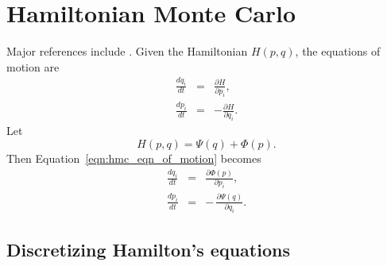 % 
% 
% 
% 
% 
%

\section{Hamiltonian Monte Carlo}
Major references include \cite{Duane1987,Neal1993,Neal1996,Neal2012}.
Given the Hamiltonian $H(p,q)$, the equations of motion are
\begin{eqnarray}
\label{eqn:hmc_eqn_of_motion}
\frac{dq_i}{dt} &=& \frac{\partial H}{\partial p_i}, \\
\frac{dp_i}{dt} &=& -\frac{\partial H}{\partial q_i}.
\end{eqnarray}
Let
\begin{equation}
H(p,q) = \Psi(q) + \Phi(p).
\end{equation}
Then Equation~\ref{eqn:hmc_eqn_of_motion} becomes
\begin{eqnarray}
\label{eqn:hmc_deriv_psi_phi}
\frac{dq_i}{dt} &=&  \frac{\partial \Phi(p)}{\partial p_i}, \\
\frac{dp_i}{dt} &=& -\,\frac{\partial \Psi(q)}{\partial q_i}.
\end{eqnarray}

\subsection{Discretizing Hamilton's equations}

